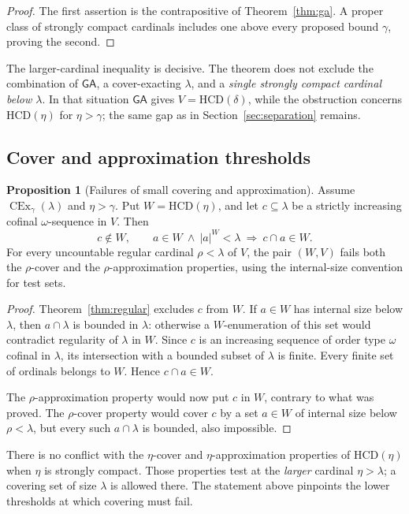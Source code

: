 \documentclass[11pt,letterpaper]{article}
\theoremstyle{definition}
\newtheorem{proposition}[definition]{Proposition}
\newcommand{\CEx}{\operatorname{CEx}}
\newcommand{\HCD}{\mathrm{HCD}}
\newcommand{\GA}{\mathsf{GA}}
\newcommand{\Cex}[2]{\CEx_{#1}(#2)}
\theoremstyle{remark}
\begin{document}
\begin{proof}
The first assertion is the contrapositive of Theorem~\ref{thm:ga}. A proper class of strongly compact cardinals includes one above every proposed bound $\gamma$, proving the second.
\end{proof}

The larger-cardinal inequality is decisive. The theorem does not exclude the combination of $\GA$, a cover-exacting $\lambda$, and a \emph{single strongly compact cardinal below $\lambda$}. In that situation $\GA$ gives $V=\HCD(\delta)$, while the obstruction concerns $\HCD(\eta)$ for $\eta>\gamma$; the same gap as in Section~\ref{sec:separation} remains.

\subsection{Cover and approximation thresholds}

\begin{proposition}[Failures of small covering and approximation]\label{prop:approx}
Assume $\Cex{\gamma}{\lambda}$ and $\eta>\gamma$. Put $W=\HCD(\eta)$, and let $c\subseteq\lambda$ be a strictly increasing cofinal $\omega$-sequence in $V$. Then
\[
 c\notin W,
 \qquad
 a\in W\ \wedge\ |a|^W<\lambda
       \ \Longrightarrow\ c\cap a\in W.
\]
For every uncountable regular cardinal $\rho<\lambda$ of $V$, the pair $(W,V)$ fails both the $\rho$-cover and the $\rho$-approximation properties, using the internal-size convention for test sets.
\end{proposition}

\begin{proof}
Theorem~\ref{thm:regular} excludes $c$ from $W$. If $a\in W$ has internal size below $\lambda$, then $a\cap\lambda$ is bounded in $\lambda$: otherwise a $W$-enumeration of this set would contradict regularity of $\lambda$ in $W$. Since $c$ is an increasing sequence of order type $\omega$ cofinal in $\lambda$, its intersection with a bounded subset of $\lambda$ is finite. Every finite set of ordinals belongs to $W$. Hence $c\cap a\in W$.

The $\rho$-approximation property would now put $c$ in $W$, contrary to what was proved. The $\rho$-cover property would cover $c$ by a set $a\in W$ of internal size below $\rho<\lambda$, but every such $a\cap\lambda$ is bounded, also impossible.
\end{proof}

There is no conflict with the $\eta$-cover and $\eta$-approximation properties of $\HCD(\eta)$ when $\eta$ is strongly compact. Those properties test at the \emph{larger} cardinal $\eta>\lambda$; a covering set of size $\lambda$ is allowed there. The statement above pinpoints the lower thresholds at which covering must fail.
\end{document}
